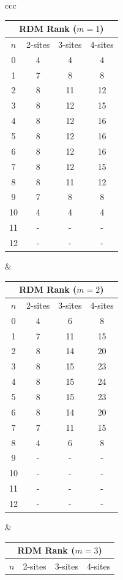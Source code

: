 \documentclass[11pt]{article}
\begin{document}
\begin{itemize}
\begin{itemize}
\begin{table}[H]
\centering

\begin{tabular}{ccc}
\begin{tabular}{|c|c|c|c|}
	\hline
	\multicolumn{4}{|c|}{\textbf{RDM Rank ($m = 1$)}} \\
	\hline
	$n$ & 2-sites & 3-sites & 4-sites \\
	\hline
	0 & 4 & 4 & 4 \\
	1 & 7 & 8 & 8 \\
	2 & 8 & 11 & 12 \\
	3 & 8 & 12 & 15 \\
	4 & 8 & 12 & 16 \\
	5 & 8 & 12 & 16 \\
	6 & 8 & 12 & 16 \\
	7 & 8 & 12 & 15 \\
	8 & 8 & 11 & 12 \\
	9 & 7 & 8 & 8 \\
	10 & 4 & 4 & 4 \\
	11 & - & - & - \\
	12 & - & - & - \\
	\hline
\end{tabular}
&
\begin{tabular}{|c|c|c|c|}
	\hline
	\multicolumn{4}{|c|}{\textbf{RDM Rank ($m = 2$)}} \\
	\hline
	$n$ & 2-sites & 3-sites & 4-sites \\
	\hline
	0 & 4 & 6 & 8 \\
	1 & 7 & 11 & 15 \\
	2 & 8 & 14 & 20 \\
	3 & 8 & 15 & 23 \\
	4 & 8 & 15 & 24 \\
	5 & 8 & 15 & 23 \\
	6 & 8 & 14 & 20 \\
	7 & 7 & 11 & 15 \\
	8 & 4 & 6 & 8 \\
	9 & - & - & - \\
	10 & - & - & - \\
	11 & - & - & - \\
	12 & - & - & - \\
	\hline
\end{tabular}
&
\begin{tabular}{|c|c|c|c|}
	\hline
	\multicolumn{4}{|c|}{\textbf{RDM Rank ($m = 3$)}} \\
	\hline
	$n$ & 2-sites & 3-sites & 4-sites \\

\end{tabular}
\end{tabular}
\end{table}
\end{itemize}
\end{itemize}
\end{document}
